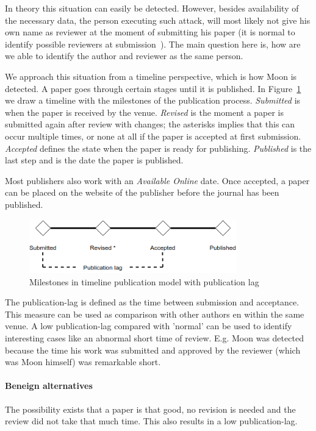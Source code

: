 \documentclass{ou-report}
\begin{document}
In theory this situation can easily be detected. However, besides 
availability of the necessary data, the person executing such attack, will 
most likely not give his own name as reviewer at the moment of submitting his 
paper (it is 
normal to identify possible reviewers at submission~\cite{C2013}). The main
question here 
is, how are we able to identify the author and reviewer as the same person.

We approach this situation from a timeline perspective, which is how Moon is 
detected. A paper goes through certain stages until it is published. In
Figure~\ref{fig:timeline} we draw a timeline with the milestones of the
publication process. \textit{Submitted} is when the paper is received by the
venue. \textit{Revised} is the moment a paper is submitted again after review
with changes; the asterisks implies that this can occur multiple times, or none
at all if the paper is accepted at first submission. \textit{Accepted} defines
the state when the paper is ready for publishing. \textit{Published} is the last
step and is the date the paper is published.

Most publishers also work with an \textit{Available Online} date. Once accepted,
a paper can be placed on the website of the publisher before the journal has
been published.

\begin{figure}[H]
\centering
\includegraphics[width=9cm]{images/timeline.drawio.png}
\caption{Milestones in timeline publication model with publication lag}
\label{fig:timeline}
\end{figure}

The publication-lag is defined as the time between submission and acceptance.
This measure can be used as comparison with other authors en within 
the same venue. A low publication-lag compared with 'normal' can be used to 
identify interesting cases like an abnormal short time of review. E.g. Moon was
detected because the time his work was submitted and approved by the
reviewer (which was Moon himself) was remarkable short.
\paragraph{Beneign alternatives}
The possibility exists that a paper is that good, no revision is needed and the 
review did not take that much time. This also results in a low publication-lag.
\end{document}
